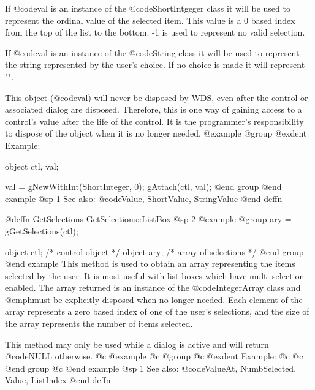 If @code{val} is an instance of the @code{ShortIntgeger} class it will
be used to represent the ordinal value of the selected item.  This value
is a 0 based index from the top of the list to the bottom.  -1 is used
to represent no valid selection.

If @code{val} is an instance of the @code{String} class it will be used
to represent the string represented by the user's choice.  If no choice is
made it will represent "".

This object (@code{val}) will never be disposed by WDS, even after
the control or associated dialog are disposed.  Therefore, this
is one way of gaining access to a control's value after the life
of the control.  It is the programmer's responsibility to dispose of
the object when it is no longer needed.
@example
@group
@exdent Example:

object  ctl, val;

val = gNewWithInt(ShortInteger, 0);
gAttach(ctl, val);
@end group
@end example
@sp 1
See also:  @code{Value, ShortValue, StringValue}
@end deffn
















@deffn {GetSelections} GetSelections::ListBox
@sp 2
@example
@group
ary = gGetSelections(ctl);

object  ctl;   /*  control object       */
object  ary;   /*  array of selections  */
@end group
@end example
This method is used to obtain an array representing the items selected
by the user.  It is most useful with list boxes which have multi-selection
enabled.  The array returned is an instance of the @code{IntegerArray} class
and @emph{must} be explicitly disposed when no longer needed.  Each element
of the array represents a zero based index of one of the user's selections,
and the size of the array represents the number of items selected.

This method may only be used while a dialog is active and will return
@code{NULL} otherwise.
@c @example
@c @group
@c @exdent Example:
@c 
@c @end group
@c @end example
@sp 1
See also:  @code{ValueAt, NumbSelected, Value, ListIndex}
@end deffn
















